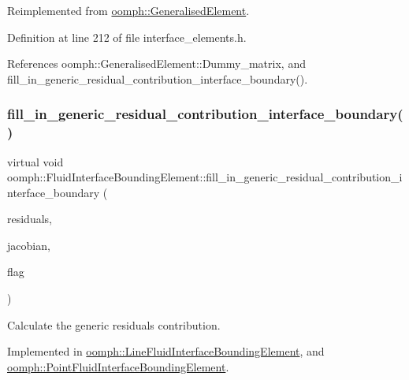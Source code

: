 Reimplemented from \hyperlink{classoomph_1_1GeneralisedElement_a310c97f515e8504a48179c0e72c550d7}{oomph\+::\+Generalised\+Element}.



Definition at line 212 of file interface\+\_\+elements.\+h.



References oomph\+::\+Generalised\+Element\+::\+Dummy\+\_\+matrix, and fill\+\_\+in\+\_\+generic\+\_\+residual\+\_\+contribution\+\_\+interface\+\_\+boundary().

\mbox{\label{classoomph_1_1FluidInterfaceBoundingElement_a69fa099e0cbfe8ae028a4edc77fedc60}} 
\subsubsection{\texorpdfstring{fill\+\_\+in\+\_\+generic\+\_\+residual\+\_\+contribution\+\_\+interface\+\_\+boundary()}{fill\_in\_generic\_residual\_contribution\_interface\_boundary()}}
{\footnotesize\ttfamily virtual void oomph\+::\+Fluid\+Interface\+Bounding\+Element\+::fill\+\_\+in\+\_\+generic\+\_\+residual\+\_\+contribution\+\_\+interface\+\_\+boundary (\begin{DoxyParamCaption}\item[{\hyperlink{classoomph_1_1Vector}{Vector}$<$ double $>$ \&}]{residuals,  }\item[{\hyperlink{classoomph_1_1DenseMatrix}{Dense\+Matrix}$<$ double $>$ \&}]{jacobian,  }\item[{unsigned}]{flag }\end{DoxyParamCaption})\hspace{0.3cm}{\ttfamily [pure virtual]}}



Calculate the generic residuals contribution. 



Implemented in \hyperlink{classoomph_1_1LineFluidInterfaceBoundingElement_aa162a09ba8dfcba4d81e6abaa7a29986}{oomph\+::\+Line\+Fluid\+Interface\+Bounding\+Element}, and \hyperlink{classoomph_1_1PointFluidInterfaceBoundingElement_aad95a7d6f4e4349ee1136e623aa69c88}{oomph\+::\+Point\+Fluid\+Interface\+Bounding\+Element}.



